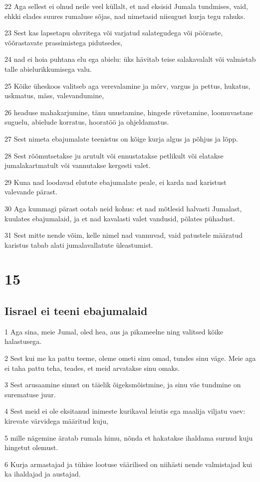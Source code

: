 \par 22 Aga sellest ei olnud neile veel küllalt, et nad eksisid Jumala tundmises, vaid, ehkki elades suures rumaluse sõjas, nad nimetasid niisugust kurja tegu rahuks.
\par 23 Sest kas lapsetapu ohvritega või varjatud salategudega või pööraste, võõrastavate prassimistega pidutsedes,
\par 24 nad ei hoia puhtana elu ega abielu: üks hävitab teise salakavalalt või valmistab talle abielurikkumisega valu.
\par 25 Kõike üheskoos valitseb aga verevalamine ja mõrv, vargus ja pettus, hukatus, uskmatus, mäss, valevandumine,
\par 26 headuse mahakarjumine, tänu unustamine, hingede rüvetamine, loomuvastane suguelu, abielude korratus, hooratöö ja ohjeldamatus.
\par 27 Sest nimeta ebajumalate teenistus on kõige kurja algus ja põhjus ja lõpp.
\par 28 Sest rõõmutsetakse ju arutult või ennustatakse petlikult või elatakse jumalakartmatult või vannutakse kergesti valet.
\par 29 Kuna nad loodavad elutute ebajumalate peale, ei karda nad karistust valevande pärast.
\par 30 Aga kummagi pärast ootab neid kohus: et nad mõtlesid halvasti Jumalast, kuulates ebajumalaid, ja et nad kavalasti valet vandusid, põlates pühadust.
\par 31 Sest mitte nende võim, kelle nimel nad vannuvad, vaid patustele määratud karistus tabab alati jumalavallatute üleastumist. 

\chapter{15} 

\section*{Iisrael ei teeni ebajumalaid}

\par 1 Aga sina, meie Jumal, oled hea, aus ja pikameelne ning valitsed kõike halastusega.
\par 2 Sest kui me ka pattu teeme, oleme ometi sinu omad, tundes sinu väge. Meie aga ei taha pattu teha, teades, et meid arvatakse sinu omaks.
\par 3 Sest arusaamine sinust on täielik õigeksmõistmine, ja sinu väe tundmine on surematuse juur.
\par 4 Sest meid ei ole eksitanud inimeste kurikaval leiutis ega maalija viljatu vaev: kirevate värvidega määritud kuju,
\par 5 mille nägemine äratab rumala himu, nõnda et hakatakse ihaldama surnud kuju hingetut olemust.
\par 6 Kurja armastajad ja tühise lootuse väärilised on niihästi nende valmistajad kui ka ihaldajad ja austajad. 

